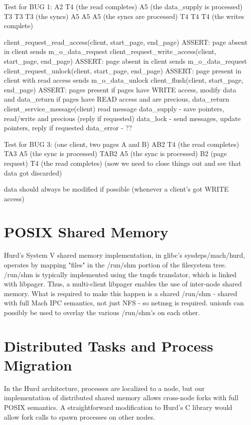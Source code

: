 \documentclass{article}
\begin{document}
Test for BUG 1:
  A2 T4 (the read completes) A5 (the data_supply is processed)
    T3 T3 T3 (the syncs) A5 A5 A5 (the syncs are processed) T4 T4 T4 (the writes complete)

client_request_read_access(client, start_page, end_page)
  ASSERT: page absent in client
  sends m_o_data_request
client_request_write_access(client, start_page, end_page)
  ASSERT: page absent in client
  sends m_o_data_request
client_request_unlock(client, start_page, end_page)
  ASSERT: page present in client with read access
  sends m_o_data_unlock
client_flush(client, start_page, end_page)
  ASSERT: pages present
  if pages have WRITE access, modify data and data_return
  if pages have READ access and are precious, data_return
client_service_message(client)
  read message
  data_supply - save pointers, read/write and precious (reply if requested)
  data_lock - send messages, update pointers, reply if requested
  data_error - ??

Test for BUG 3: (one client, two pages A and B)
  AB2 T4 (the read completes) TA3 A5 (the sync is processed) TAB2 A5 (the sync is processed)
    B2 (page request) T4 (the read completes)
    (now we need to close things out and see that data got discarded)

data should always be modified if possible (whenever a client's got WRITE access)



\section{POSIX Shared Memory}

Hurd's System V shared memory implementation, in glibc's
sysdeps/mach/hurd, operates by mapping "files" in the /run/shm portion
of the filesystem tree.  /run/shm is typically implemented using the
tmpfs translator, which is linked with libpager.  Thus, a multi-client
libpager enables the use of inter-node shared memory.  What is
required to make this happen is a shared /run/shm - shared with full
Mach IPC semantics, not just NFS - so netmsg is required.  unionfs can
possibly be used to overlay the various /run/shm's on each other.


\section{Distributed Tasks and Process Migration}

In the Hurd architecture, processes are localized to a node, but our
implementation of distributed shared memory allows cross-node forks
with full POSIX semantics.  A straightforward modification to
Hurd's C library would allow fork calls to spawn processes
on other nodes.
\end{document}

